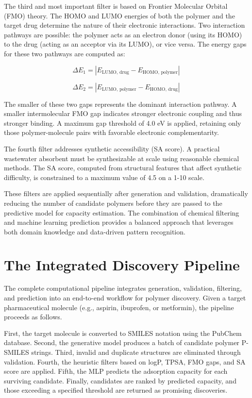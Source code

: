 The third and most important filter is based on Frontier Molecular Orbital (FMO) theory. The HOMO and LUMO energies of both the polymer and the target drug determine the nature of their electronic interactions. Two interaction pathways are possible: the polymer acts as an electron donor (using its HOMO) to the drug (acting as an acceptor via its LUMO), or vice versa. The energy gaps for these two pathways are computed as:

\begin{equation}
	\Delta E_1 = |E_{\text{LUMO, drug}} - E_{\text{HOMO, polymer}}|
\end{equation}

\begin{equation}
	\Delta E_2 = |E_{\text{LUMO, polymer}} - E_{\text{HOMO, drug}}|
\end{equation}

The smaller of these two gaps represents the dominant interaction pathway. A smaller intermolecular FMO gap indicates stronger electronic coupling and thus stronger binding. A maximum gap threshold of 4.0 eV is applied, retaining only those polymer-molecule pairs with favorable electronic complementarity.

The fourth filter addresses synthetic accessibility (SA score). A practical wastewater absorbent must be synthesizable at scale using reasonable chemical methods. The SA score, computed from structural features that affect synthetic difficulty, is constrained to a maximum value of 4.5 on a 1-10 scale.

These filters are applied sequentially after generation and validation, dramatically reducing the number of candidate polymers before they are passed to the predictive model for capacity estimation. The combination of chemical filtering and machine learning prediction provides a balanced approach that leverages both domain knowledge and data-driven pattern recognition.

\section{The Integrated Discovery Pipeline}
\label{sec:discovery_pipeline}

The complete computational pipeline integrates generation, validation, filtering, and prediction into an end-to-end workflow for polymer discovery. Given a target pharmaceutical molecule (e.g., aspirin, ibuprofen, or metformin), the pipeline proceeds as follows.

First, the target molecule is converted to SMILES notation using the PubChem database. Second, the generative model produces a batch of candidate polymer P-SMILES strings. Third, invalid and duplicate structures are eliminated through validation. Fourth, the heuristic filters based on logP, TPSA, FMO gaps, and SA score are applied. Fifth, the MLP predicts the adsorption capacity for each surviving candidate. Finally, candidates are ranked by predicted capacity, and those exceeding a specified threshold are returned as promising discoveries.

